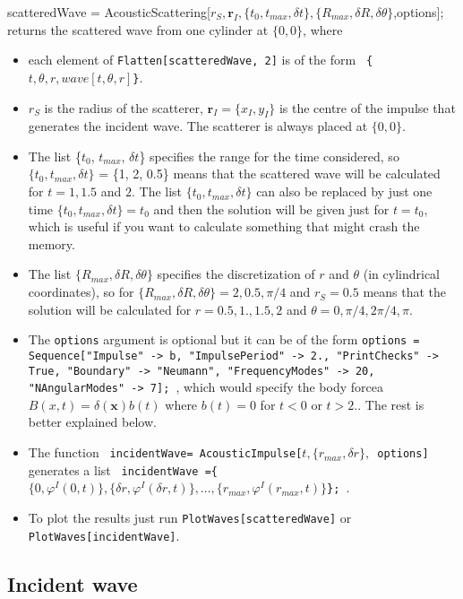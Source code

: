 \documentclass[ 12pt, a4paper]{article}
\renewcommand{\vec}[1]{\boldsymbol{#1}}
\begin{document}
{\ttfamily
scatteredWave = AcousticScattering[$r_S, \vec r_I, \{t_0, t_{max}, \delta t\}, \{R_{max}, \delta R, \delta \theta\}$,options];
}
returns the scattered wave from one cylinder at $\{0,0\}$, where
\begin{itemize}
\item each element of \texttt{Flatten[scatteredWave, 2]} is of the form \texttt{ \{$t, \theta, r,
    wave[t,\theta,r]$\}}.

\item $r_S$ is the radius of the scatterer, $\vec r_I = \{x_I, y_I \}$ is the centre of the impulse that generates the incident wave. The scatterer is always placed at $\{0,0\}$.
\item The list \{$t_0$, $t_{max}$, $\delta t$\} specifies the range for the time considered, so $\{t_0, t_{max}, \delta t\}$ = \{1, 2, 0.5\} means that the scattered wave will be calculated for $t =1, 1.5$ and $2$. The list $\{t_0, t_{max}, \delta t\}$ can also be replaced by just one time $\{t_0, t_{max}, \delta t\} =t_0$ and then the solution will be given just for $t=t_0$, which is useful if you want to calculate something that might crash the memory.
\item The list $\{R_{max}, \delta R, \delta \theta\}$ specifies the discretization of $r$ and $\theta$ (in cylindrical coordinates), so for $\{R_{max}, \delta R, \delta \theta\} ={2, 0.5, \pi/4}$ and $r_S= 0.5$ means that the solution will be calculated for $r =0.5, 1., 1.5,2$ and $\theta =0, \pi/4, 2\pi/4, \pi$.
\item The \texttt{options} argument is optional but it can be of the form \texttt{options = Sequence["Impulse" -> b, "ImpulsePeriod" -> 2.,
  "PrintChecks" -> True, "Boundary" -> "Neumann",   "FrequencyModes" -> 20, "NAngularModes" -> 7]; }, which would specify the  body forcea $B(x,t) = \delta(\vec x) b(t)$ where $b(t) =0$ for $t<0$ or $t>2.$. The rest is better explained below.
\item The function \texttt{
incidentWave= AcousticImpulse[$t, \{r_{max},\delta r\},$ options]
} generates a list \texttt{ incidentWave =\{$\{0, \varphi^I(0,t)\},\{\delta r, \varphi^I(\delta r,t)\} ,\ldots, \{r_{max}, \varphi^I(r_{max},t)\}$\}; }.
\item To plot the results just run \texttt{PlotWaves[scatteredWave]} or  \texttt{PlotWaves[incidentWave]}.
\end{itemize}


\subsection{Incident wave}
\end{document}
